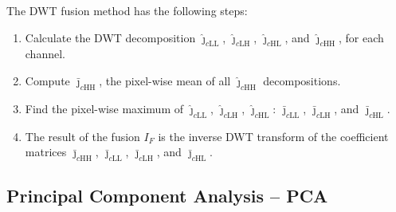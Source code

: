 \documentclass[journal]{IEEEtran}
\begin{document}
The DWT fusion method has the following steps:
\begin{enumerate}
\item Calculate the DWT decomposition $\bm{\widehat\jmath}_{c\text{LL}}$, $\bm{\widehat\jmath}_{c\text{LH}}$, $\bm{\widehat\jmath}_{c\text{HL}}$, and $\bm{\widehat\jmath}_{c\text{HH}}$, for each channel.
\item Compute $\bm{\bar\jmath}_{c\text{HH}}$, the pixel-wise mean of all $\bm{\widehat\jmath}_{c\text{HH}}$ decompositions.
\item Find the pixel-wise maximum of $\bm{\widehat\jmath}_{c\text{LL}}$, $\bm{\widehat\jmath}_{c\text{LH}}$, $\bm{\widehat\jmath}_{c\text{HL}}$: $\bm{\bar\jmath}_{c\text{LL}}$, $\bm{\bar\jmath}_{c\text{LH}}$, and $\bm{\bar\jmath}_{c\text{HL}}$.
\item The result of the fusion $I_F$ is the inverse DWT transform of the coefficient matrices $\bm{\bar\jmath}_{c\text{HH}}$, $\bm{\bar\jmath}_{c\text{LL}}$, $\bm{\bar\jmath}_{c\text{LH}}$, and $\bm{\bar\jmath}_{c\text{HL}}$.
\end{enumerate}
\subsection{Principal Component Analysis -- PCA}
\end{document}
